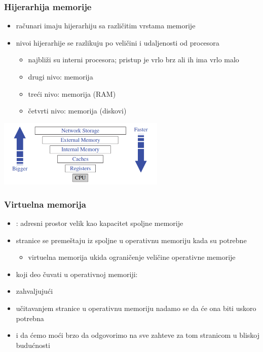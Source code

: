 \documentclass[compress,aspectratio=169]{beamer}
\begin{document}
\begin{frame}[fragile]
  \frametitle{Hijerarhija memorije}
  \begin{itemize}
    \item računari imaju hijerarhiju sa različitim vrstama memorije
    \item nivoi hijerarhije se razlikuju po veličini i udaljenosti od procesora
    \begin{itemize}
      \item najbliži su interni  procesora; pristup je vrlo brz ali ih ima vrlo malo
      \item drugi nivo:  memorija
      \item treći nivo:  memorija (RAM)
      \item četvrti nivo:  memorija (diskovi)
    \end{itemize}
  \end{itemize}
  \begin{center}
    \includegraphics[width=8cm]{asp-15-pic02.png}
  \end{center}
\end{frame}

\begin{frame}[fragile]
  \frametitle{Virtuelna memorija}
  \begin{itemize}
    \item {}: adresni prostor velik kao 
    kapacitet spoljne memorije
    \item stranice se premeštaju iz spoljne u operativnu memoriju kada 
    su potrebne
    \begin{itemize}
      \item virtuelna memorija ukida ograničenje veličine operativne 
      memorije
    \end{itemize}
    \item koji deo čuvati u operativnoj memoriji: 
    \item zahvaljujući 
    \item učitavanjem stranice u operativnu memoriju nadamo se da će ona
    biti uskoro potrebna
    \item i da ćemo moći brzo da odgovorimo na sve zahteve za tom
    stranicom u bliskoj budućnosti
  \end{itemize}
\end{frame}
\end{document}
